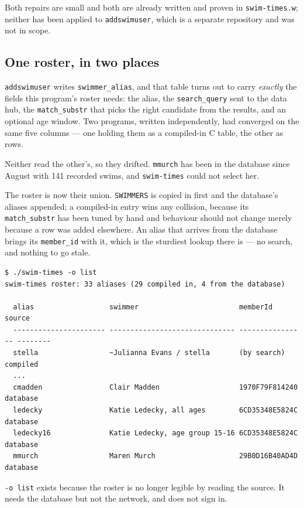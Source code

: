 \documentclass[11pt]{article}
\newcommand{\code}[1]{\texttt{#1}}
\begin{document}
Both repairs are small and both are already written and proven in
\code{swim-times.w}; neither has been applied to \code{addswimuser},
which is a separate repository and was not in scope.

\subsection{One roster, in two places}

\code{addswimuser} writes \code{swimmer\_alias}, and that table turns
out to carry \emph{exactly} the fields this program's roster needs: the
alias, the \code{search\_query} sent to the data hub, the
\code{match\_substr} that picks the right candidate from the results,
and an optional age window.  Two programs, written independently, had
converged on the same five columns --- one holding them as a compiled-in
C table, the other as rows.

Neither read the other's, so they drifted.  \code{mmurch} has been in
the database since August with 141 recorded swims, and
\code{swim-times} could not select her.

The roster is now their union.  \code{SWIMMERS} is copied in first and
the database's aliases appended; a compiled-in entry wins any
collision, because its \code{match\_substr} has been tuned by hand and
behaviour should not change merely because a row was added elsewhere.
An alias that arrives from the database brings its \code{member\_id}
with it, which is the sturdiest lookup there is --- no search, and
nothing to go stale.

\begin{lstlisting}
$ ./swim-times -o list
swim-times roster: 33 aliases (29 compiled in, 4 from the database)

  alias                  swimmer                        memberId         source
  ---------------------- ------------------------------ ---------------- --------
  stella                 ~Julianna Evans / stella       (by search)      compiled
  ...
  cmadden                Clair Madden                   1970F79F814240   database
  ledecky                Katie Ledecky, all ages        6CD35348E5824C   database
  ledecky16              Katie Ledecky, age group 15-16 6CD35348E5824C   database
  mmurch                 Maren Murch                    29B0D16B40AD4D   database
\end{lstlisting}

\noindent \code{-o list} exists because the roster is no longer legible
by reading the source.  It needs the database but not the network, and
does not sign in.
\end{document}
